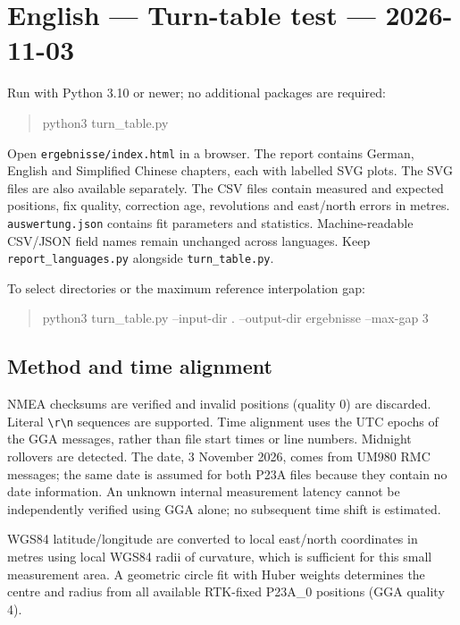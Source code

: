 \documentclass[11pt,a4paper]{article}
\begin{document}
\clearpage\section{English — Turn-table test — 2026-11-03}

Run with Python 3.10 or newer; no additional packages are required:

\begin{quote}\ttfamily\footnotesize python3 turn\_table.py\end{quote}

Open {\small\texttt{ergebnisse/\allowbreak{}index.html}} in a browser. The report contains German, English and Simplified Chinese chapters, each with labelled SVG plots. The SVG files are also available separately. The CSV files contain measured and expected positions, fix quality, correction age, revolutions and east/north errors in metres. {\small\texttt{auswertung.json}} contains fit parameters and statistics. Machine-readable CSV/JSON field names remain unchanged across languages. Keep {\small\texttt{report\_\allowbreak{}languages.py}} alongside {\small\texttt{turn\_\allowbreak{}table.py}}.

To select directories or the maximum reference interpolation gap:

\begin{quote}\ttfamily\footnotesize python3 turn\_table.py --input-dir . --output-dir ergebnisse --max-gap 3\end{quote}

\subsection{Method and time alignment}

NMEA checksums are verified and invalid positions (quality 0) are discarded. Literal {\small\texttt{\textbackslash{}r\textbackslash{}n}} sequences are supported. Time alignment uses the UTC epochs of the GGA messages, rather than file start times or line numbers. Midnight rollovers are detected. The date, 3 November 2026, comes from UM980 RMC messages; the same date is assumed for both P23A files because they contain no date information. An unknown internal measurement latency cannot be independently verified using GGA alone; no subsequent time shift is estimated.

WGS84 latitude/longitude are converted to local east/north coordinates in metres using local WGS84 radii of curvature, which is sufficient for this small measurement area. A geometric circle fit with Huber weights determines the centre and radius from all available RTK-fixed P23A\_0 positions (GGA quality 4).
\end{document}
